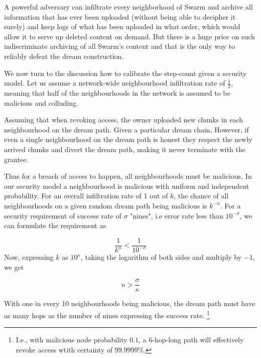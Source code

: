 A powerful adversary can infiltrate every neighborhood of Swarm and archive all information that has ever been uploaded (without being able to decipher it surely) and keep logs of what has been uploaded in what order, which would allow it to serve up deleted content on demand. But there is a huge price on such indiscriminate archiving of all Swarm's content and that is the only way to reliably defeat the dream construction.

We now turn to the discussion how to calibrate the step-count given a security model. Let us assume a network-wide neighbourhood infiltration rate of $\frac{1}{2}$, meaning that  half of the neighbourhoods in the network is assumed  to be  malicious and colluding. 

Assuming that when  revoking access, the owner uploaded new chunks in each neighbourhood on the dream path. 
Given a particular dream chain, 
However, if even  a single neighbourhood on the dream path is honest they respect the newly arrived chunks and divert the dream path, making it never terminate with the grantee. 


Thus for  a breach of access to happen, all neighbourhoods must be malicious.
In our security model a neighbourhood is malicious with  uniform and independent probability.  For an overall infiltration rate of 1 out of $k$, the chance of all neighbourhoods on a given random dream path being malicious is $k^{-n}$. For a security requirement of success rate of $\sigma$ "nines", i.e error rate less than $10^{-\sigma}$,  we can formulate the requirement as

\begin{equation}
    \frac{1}{k^n}< \frac{1}{10^{-\sigma}}
\end{equation}
Now, expressing $k$ as $10^\kappa$, taking the logarithm of both sides and multiply by $-1$, we get

\begin{equation}
    n > \frac{\sigma}{\kappa}
\end{equation}

With one in every 10 neighbourhoods being malicious, the dream path must have as many hops as the number of nines expressing the success rate.%
%
\footnote{I.e., with malicious node probability $0.1$, a 6-hop-long path will effectively revoke access wtith certainty of $99.9999\%$.}
